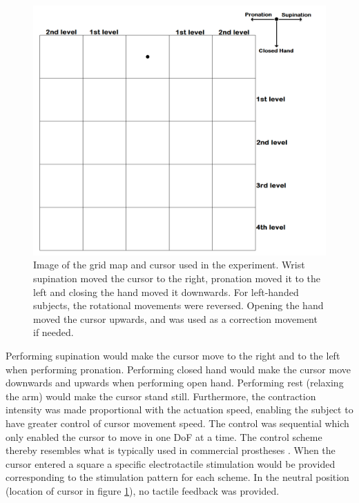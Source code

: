\begin{figure}[H]                 
	\includegraphics[width=1\textwidth]{figures/gridmap2}  
	\caption{Image of the grid map and cursor used in the experiment. Wrist supination moved the cursor to the right, pronation moved it to the left and closing the hand moved it downwards. For left-handed subjects, the rotational movements were reversed. Opening the hand moved the cursor upwards, and was used as a correction movement if needed.}
	\label{fig:pa:gridmap} 
\end{figure}

Performing supination would make the cursor move to the right and to the left when performing pronation. Performing closed hand would make the cursor move downwards and upwards when performing open hand. Performing rest (relaxing the arm) would make the cursor stand still. Furthermore, the contraction intensity was made proportional with the actuation speed, enabling the subject to have greater control of cursor movement speed. The control was sequential which only enabled the cursor to move in one DoF at a time. The control scheme thereby resembles what is typically used in commercial prostheses \cite{Atzori2015}. When the cursor entered a square a specific electrotactile stimulation would be provided corresponding to the stimulation pattern for each scheme. In the neutral position (location of cursor in figure \ref{fig:pa:gridmap}), no tactile feedback was provided.     

